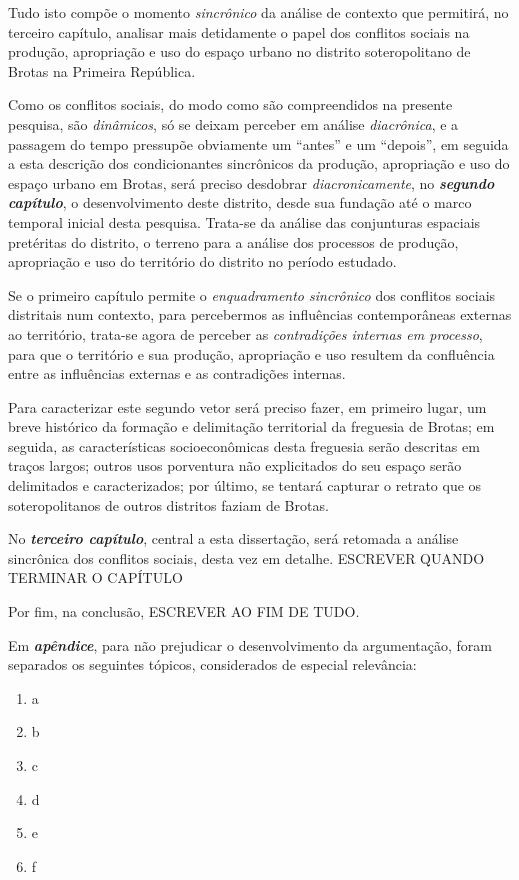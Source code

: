Tudo isto compõe o momento \textit{sincrônico} da análise de contexto que permitirá, no terceiro capítulo, analisar mais detidamente o papel dos conflitos sociais na produção, apropriação e uso do espaço urbano no distrito soteropolitano de Brotas na Primeira República.

Como os conflitos sociais, do modo como são compreendidos na presente pesquisa, são \textit{dinâmicos}, só se deixam perceber em análise \textit{diacrônica}, e a passagem do tempo pressupõe obviamente um ``antes'' e um ``depois'', em seguida a esta descrição dos condicionantes sincrônicos da produção, apropriação e uso do espaço urbano em Brotas, será preciso desdobrar \textit{diacronicamente}, no \textbf{\textit{segundo capítulo}}, o desenvolvimento deste distrito, desde sua fundação até o marco temporal inicial desta pesquisa. Trata-se da análise das conjunturas espaciais pretéritas do distrito, o terreno para a análise dos processos de produção, apropriação e uso do território do distrito no período estudado. 

Se o primeiro capítulo permite o \textit{enquadramento sincrônico} dos conflitos sociais distritais num contexto, para percebermos as influências contemporâneas externas ao território, trata-se agora de perceber as \textit{contradições internas em processo}, para que o território e sua produção, apropriação e uso resultem da confluência entre as influências externas e as contradições internas. 

Para caracterizar este segundo vetor será preciso fazer, em primeiro lugar, um breve histórico da formação e delimitação territorial da freguesia de Brotas; em seguida, as características socioeconômicas desta freguesia serão descritas em traços largos; outros usos porventura não explicitados do seu espaço serão delimitados e caracterizados; por último, se tentará capturar o retrato que os soteropolitanos de outros distritos faziam de Brotas. 

No \textbf{\textit{terceiro capítulo}}, central a esta dissertação, será retomada a análise sincrônica dos conflitos sociais, desta vez em detalhe. ESCREVER QUANDO TERMINAR O CAPÍTULO

Por fim, na conclusão, ESCREVER AO FIM DE TUDO.

Em \textbf{\textit{apêndice}}, para não prejudicar o desenvolvimento da argumentação, foram separados os seguintes tópicos, considerados de especial relevância:

\begin{enumerate}
\item a
\item b
\item c
\item d
\item e
\item f
\end{enumerate}

